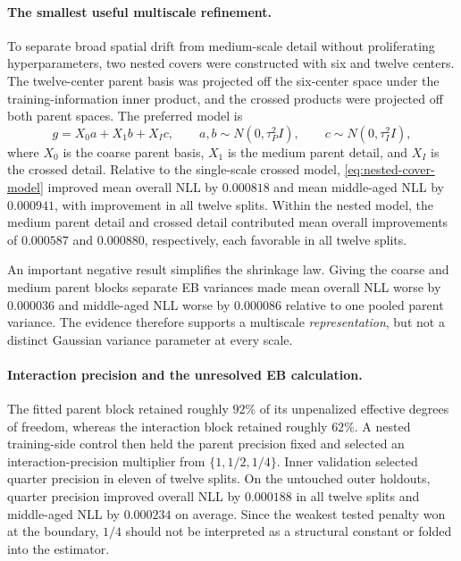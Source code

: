\documentclass[11pt]{article}
\begin{document}
\paragraph{The smallest useful multiscale refinement.}
To separate broad spatial drift from medium-scale detail without proliferating hyperparameters, two
nested covers were constructed with six and twelve centers. The twelve-center parent basis was
projected off the six-center space under the training-information inner product, and the crossed
products were projected off both parent spaces. The preferred model is
\begin{equation}\label{eq:nested-cover-model}
 g=X_0a+X_1b+X_Ic,
 \qquad a,b\sim N(0,\tau_P^2I),\qquad c\sim N(0,\tau_I^2I),
\end{equation}
where $X_0$ is the coarse parent basis, $X_1$ is the medium parent detail, and $X_I$ is the crossed
detail. Relative to the single-scale crossed model, \eqref{eq:nested-cover-model} improved mean
overall NLL by $0.000818$ and mean middle-aged NLL by $0.000941$, with improvement in all twelve
splits. Within the nested model, the medium parent detail and crossed detail contributed mean overall
improvements of $0.000587$ and $0.000880$, respectively, each favorable in all twelve splits.

An important negative result simplifies the shrinkage law. Giving the coarse and medium parent
blocks separate EB variances made mean overall NLL worse by $0.000036$ and middle-aged NLL worse by
$0.000086$ relative to one pooled parent variance. The evidence therefore supports a multiscale
\emph{representation}, but not a distinct Gaussian variance parameter at every scale.

\paragraph{Interaction precision and the unresolved EB calculation.}
The fitted parent block retained roughly $92\%$ of its unpenalized effective degrees of freedom,
whereas the interaction block retained roughly $62\%$. A nested training-side control then held the
parent precision fixed and selected an interaction-precision multiplier from
$\{1,1/2,1/4\}$. Inner validation selected quarter precision in eleven of twelve splits. On the
untouched outer holdouts, quarter precision improved overall NLL by $0.000188$ in all twelve splits
and middle-aged NLL by $0.000234$ on average. Since the weakest tested penalty won at the boundary,
$1/4$ should not be interpreted as a structural constant or folded into the estimator.
\end{document}
